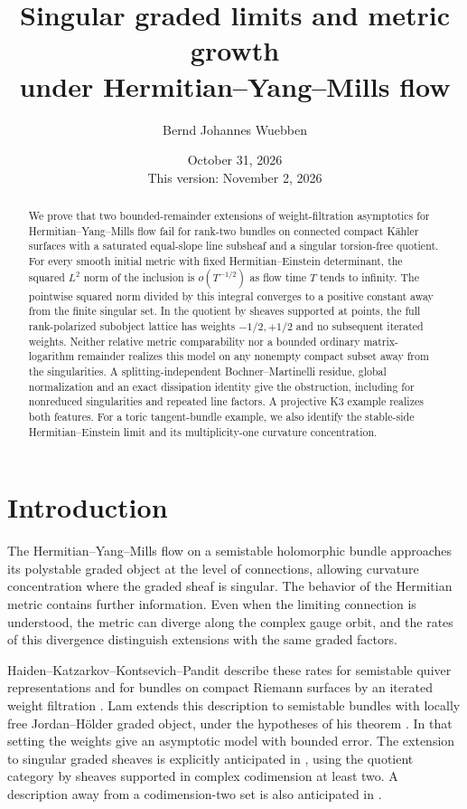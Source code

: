\documentclass[11pt]{amsart}
\title[Singular graded limits and metric growth]{Singular graded limits and metric growth\\under Hermitian--Yang--Mills flow}
\author{Bernd Johannes Wuebben}
\date{October 31, 2026\\This version: November 2, 2026}
\theoremstyle{definition}
\theoremstyle{remark}
\begin{document}
\begin{abstract}
We prove that two bounded-remainder extensions of weight-filtration
asymptotics for Hermitian--Yang--Mills flow fail for rank-two bundles on
connected compact K\"ahler surfaces with a saturated equal-slope line subsheaf and
a singular torsion-free quotient. For every smooth initial metric with
fixed Hermitian--Einstein determinant, the squared $L^2$ norm of the
inclusion is $o(T^{-1/2})$ as flow time $T$ tends to infinity. The
pointwise squared norm divided by this integral converges to a positive
constant away from the finite singular set. In the quotient by sheaves supported at points, the full
rank-polarized subobject lattice has weights $-1/2,+1/2$ and no subsequent
iterated weights. Neither relative metric comparability nor a bounded
ordinary matrix-logarithm remainder realizes this model on any nonempty
compact subset away from the singularities. A splitting-independent
Bochner--Martinelli residue, global normalization and an exact dissipation
identity give the obstruction, including for nonreduced singularities and
repeated line factors. A projective K3 example realizes both features.
For a toric tangent-bundle example, we also identify the stable-side
Hermitian--Einstein limit and its multiplicity-one curvature concentration.
\end{abstract}

\maketitle


\section{Introduction}\label{sec:introduction}

The Hermitian--Yang--Mills flow on a semistable holomorphic bundle
approaches its polystable graded object at the level of connections,
allowing curvature concentration where the graded sheaf is singular.
The behavior of the Hermitian metric contains further information.
Even when the limiting connection is understood, the metric can diverge
along the complex gauge orbit, and the rates of this divergence distinguish
extensions with the same graded factors.

Haiden--Katzarkov--Kontsevich--Pandit describe these rates for semistable
quiver representations and for bundles on compact Riemann surfaces by
an iterated weight filtration \cite{hkkp2023,hkkp2018}. Lam extends this
description to semistable bundles with locally free Jordan--H\"older
graded object, under the hypotheses of his theorem
\cite[Theorems~1.1, 8.2 and the setup in \S8]{lam2026}. In that setting the
weights give an asymptotic model with bounded error. The extension to
singular graded sheaves is explicitly anticipated in
\cite[Introduction and Remark~8.3]{lam2026}, using the quotient category
by sheaves supported in complex codimension at least two. A description
away from a codimension-two set is also anticipated in
\cite[Introduction]{hkkp2018}.
\end{document}

